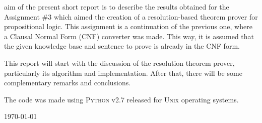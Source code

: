 \documentclass[11pt,journal,compsoc]{IEEEtran}
\begin{document}
 aim of the present short report is to describe the results obtained for the Assignment \#3 which aimed the creation of a resolution-based theorem prover for propositional logic. This assignment is a continuation of the previous one, where a Clausal Normal Form (CNF) converter was made. This way, it is assumed that the given knowledge base and sentence to prove is already in the CNF form.

This report will start with the discussion of the resolution theorem prover, particularly its algorithm and implementation. After that, there will be some complementary remarks and conclusions.

The code was made using \textsc{Python} v2.7 released for \textsc{Unix} operating systems.

\hfill 
 
\hfill \today
\end{document}
